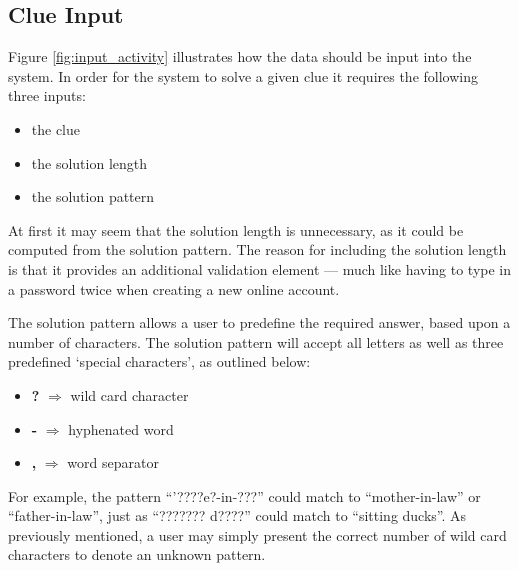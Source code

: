 \subsection{Clue Input} 
\label{sub:input}

Figure \ref{fig:input_activity} illustrates how the data should be input into 
the system. In order for the system to solve a given clue it requires the 
following three inputs:

\begin{itemize}
  \item the clue 
  \item the solution length
  \item the solution pattern
\end{itemize}

At first it may seem that the solution length is unnecessary, as it could be 
computed from the solution pattern. The reason for including the solution length
is that it provides an additional validation element --- much like having to 
type in a password twice when creating a new online account.

The solution pattern allows a user to predefine the required answer, based upon 
a number of characters. The solution pattern will accept all letters as well as 
three predefined `special characters', as outlined below:

\begin{itemize}
  \item[] \textbf{?} $\Rightarrow$ wild card character
  \item[] \textbf{-} $\Rightarrow$ hyphenated word 
  \item[] \textbf{,} $\Rightarrow$ word separator
\end{itemize}

For example, the pattern ``'????e?-in-???'' could match to ``mother-in-law'' or 
``father-in-law'', just as ``??????? d????'' could match to ``sitting ducks''.
As previously mentioned, a user may simply present the correct number of wild 
card characters to denote an unknown pattern.

